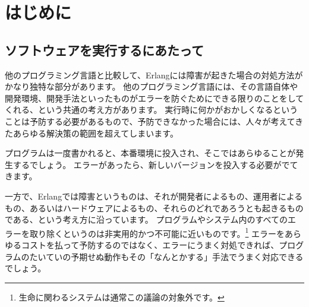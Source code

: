 \chapter{はじめに}
\label{chap:introduction}

\section*{ソフトウェアを実行するにあたって}
\label{sec:on-running-software}


他のプログラミング言語と比較して、Erlangには障害が起きた場合の対処方法がかなり独特な部分があります。
他のプログラミング言語には、その言語自体や開発環境、開発手法といったものがエラーを防ぐためにできる限りのことをしてくれる、という共通の考え方があります。
実行時に何かがおかしくなるということは予防する必要があるもので、予防できなかった場合には、人々が考えてきたあらゆる解決策の範囲を超えてしまいます。

プログラムは一度書かれると、本番環境に投入され、そこではあらゆることが発生するでしょう。
エラーがあったら、新しいバージョンを投入する必要がでてきます。

一方で、Erlangでは障害というものは、それが開発者によるもの、運用者によるもの、あるいはハードウェアによるもの、それらのどれであろうとも起きるものである、という考え方に沿っています。
プログラムやシステム内のすべてのエラーを取り除くというのは非実用的かつ不可能に近いものです。\footnote{生命に関わるシステムは通常この議論の対象外です。}
エラーをあらゆるコストを払って予防するのではなく、エラーにうまく対処できれば、プログラムのたいていの予期せぬ動作もその「なんとかする」手法でうまく対応できるでしょう。


